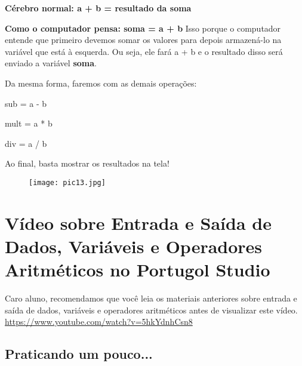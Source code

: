 \documentclass{article}
\begin{document}
\textbf{Cérebro normal: a + b = resultado da soma}

\textbf{Como o computador pensa: soma = a + b}
Isso porque o computador entende que primeiro devemos somar os valores para depois armazená-lo na variável que está à esquerda. Ou seja, ele fará a + b e o resultado disso será enviado a variável \textbf{soma}.

Da mesma forma, faremos com as demais operações:

sub = a - b

mult = a * b

div = a / b

Ao final, basta mostrar os resultados na tela!
\begin{figure}[H]
    \centering
    \texttt{[image: pic13.jpg]}
    \label{fig:pic13}
\end{figure}

\section{Vídeo sobre Entrada e Saída de Dados, Variáveis e Operadores Aritméticos no Portugol Studio}
Caro aluno, recomendamos que você leia os materiais anteriores sobre entrada e saída de dados, variáveis e operadores aritméticos antes de visualizar este vídeo.
\href{https://www.youtube.com/watch?v=5hkYdnhCsn8}{https://www.youtube.com/watch?v=5hkYdnhCsn8}

\subsection{Praticando um pouco...}
\end{document}
